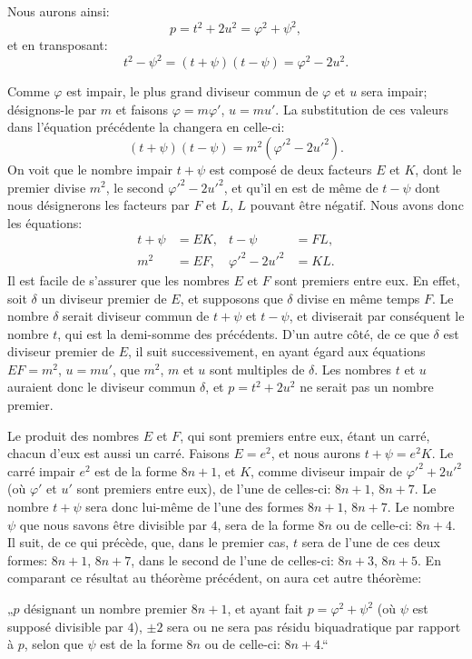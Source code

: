 \par\indent
Nous aurons ainsi:
\[
p=t^2+2u^2=\varphi^2+\psi^2,
\]
et en transposant:
\[
t^2-\psi^2=(t+\psi)(t-\psi)=\varphi^2-2u^2.
\]
\par\indent
Comme $\varphi$ est impair, le plus grand diviseur commun de $\varphi$ et $u$ sera
impair; désignons-le par $m$ et faisons $\varphi=m\varphi'$, $u=mu'$. La substitution de
ces valeurs dans l'équation précédente la changera en celle-ci:
\[
(t+\psi)(t-\psi)=m^2(\varphi'^2-2u'^2).
\]
On voit que le nombre impair $t+\psi$ est composé de deux facteurs $E$ et $K$,
dont le premier divise $m^2$, le second $\varphi'^2-2u'^2$, et qu'il en est de même de
$t-\psi$ dont nous désignerons les facteurs par $F$ et $L$, $L$ pouvant être négatif.
Nous avons donc les équations:
\[
\begin{aligned}
t+\psi&=EK, &t-\psi&=FL,\\
m^2&=EF, &\varphi'^2-2u'^2&=KL.
\end{aligned}
\]
Il est facile de s'assurer que les nombres $E$ et $F$ sont premiers entre eux. En
effet, soit $\delta$ un diviseur premier de $E$, et supposons que $\delta$ divise en même
temps $F$. Le nombre $\delta$ serait diviseur commun de $t+\psi$ et $t-\psi$, et diviserait
par conséquent le nombre $t$, qui est la demi-somme des précédents. D'un autre
côté, de ce que $\delta$ est diviseur premier de $E$, il suit successivement, en ayant
égard aux équations $EF=m^2$, $u=mu'$, que $m^2$, $m$ et $u$ sont multiples de $\delta$.
Les nombres $t$ et $u$ auraient donc le diviseur commun $\delta$, et $p=t^2+2u^2$ ne
serait pas un nombre premier.
\par\indent
Le produit des nombres $E$ et $F$, qui sont premiers entre eux, étant un
carré, chacun d'eux est aussi un carré. Faisons $E=e^2$, et nous aurons
$t+\psi=e^2K$. Le carré impair $e^2$ est de la forme $8n+1$, et $K$, comme diviseur
impair de $\varphi'^2+2u'^2$ (où $\varphi'$ et $u'$ sont premiers entre eux), de l'une de celles-ci:
$8n+1$, $8n+7$. Le nombre $t+\psi$ sera donc lui-même de l'une des formes
$8n+1$, $8n+7$. Le nombre $\psi$ que nous savons être divisible par $4$, sera de
la forme $8n$ ou de celle-ci: $8n+4$. Il suit, de ce qui précède, que, dans le
premier cas, $t$ sera de l'une de ces deux formes: $8n+1$, $8n+7$, dans le second
de l'une de celles-ci: $8n+3$, $8n+5$. En comparant ce résultat au théorème
précédent, on aura cet autre théorème:
\par\indent
„$p$ désignant un nombre premier $8n+1$, et ayant fait $p=\varphi^2+\psi^2$ (où
$\psi$ est supposé divisible par $4$), $\pm2$ sera ou ne sera pas résidu biquadratique
par rapport à $p$, selon que $\psi$ est de la forme $8n$ ou de celle-ci: $8n+4$.“
